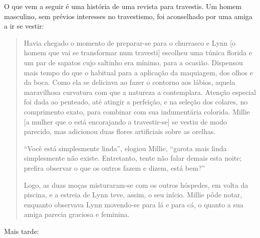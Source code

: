 O que vem a seguir é uma história de uma revista para travestis.\idxtraveporn{} Um
homem masculino, sem prévios interesses no travestismo, foi aconselhado
por uma amiga a ir se vestir:

\begin{quote}
Havia chegado o momento de preparar-se para o churrasco e Lynn [o
homem que vai se transformar num travesti] escolheu uma túnica florida
e um par de sapatos cujo saltinho era mínimo, para a ocasião. Dispensou
mais tempo do que o habitual para a aplicação da maquiagem, dos olhos e
da boca. Como ela se deliciava ao fazer o contorno aos lábios, aquela
maravilhosa curvatura com que a natureza a contemplara. Atenção
especial foi dada ao penteado, até atingir a perfeição, e na seleção
dos colares, no comprimento exato, para combinar com sua indumentária
colorida. Millie [a mulher que o está encorajando a travestir-se] se
vestiu de modo parecido, mas adicionou duas flores artificiais sobre as
orelhas.

``Você está simplesmente linda'', elogiou
Millie, ``garota mais linda simplesmente não existe.
Entretanto, tente não falar demais esta noite; prefira observar o que
os outros fazem e dizem, está bem?''

Logo, as duas moças misturaram-se com os outros hóspedes, em volta
da piscina, e a estreia de Lynn teve, assim, o seu início. Millie pôde
notar, enquanto observava Lynn movendo-se para lá e para cá, o quanto
a sua amiga parecia graciosa e feminina.
\end{quote}

Mais tarde:

